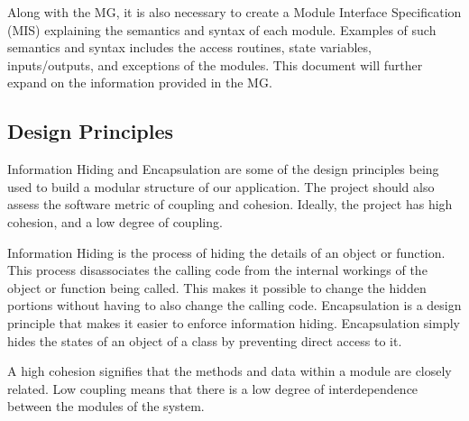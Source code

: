 \documentclass[12pt, titlepage]{article}
\begin{document}
Along with the MG, it is also necessary to create a Module Interface Specification (MIS) explaining the semantics and syntax of each module. Examples of such semantics and syntax includes the access routines, state variables, inputs/outputs, and exceptions of the modules. This document will further expand on the information provided in the MG.

\subsection{Design Principles}

Information Hiding and Encapsulation are some of the design principles being used to build a modular structure of our application. The project should also assess the software metric of coupling and cohesion. Ideally, the project has high cohesion, and a low degree of coupling.

Information Hiding is the process of hiding the details of an object or function. This process disassociates the calling code from the internal workings of the object or function being called. This makes it possible to change the hidden portions without having to also change the calling code. Encapsulation is a design principle that makes it easier to enforce information hiding. Encapsulation simply hides the states of an object of a class by preventing direct access to it. 

A high cohesion signifies that the methods and data within a module are closely related. Low coupling means that there is a low degree of interdependence between the modules of the system. 
\end{document}
